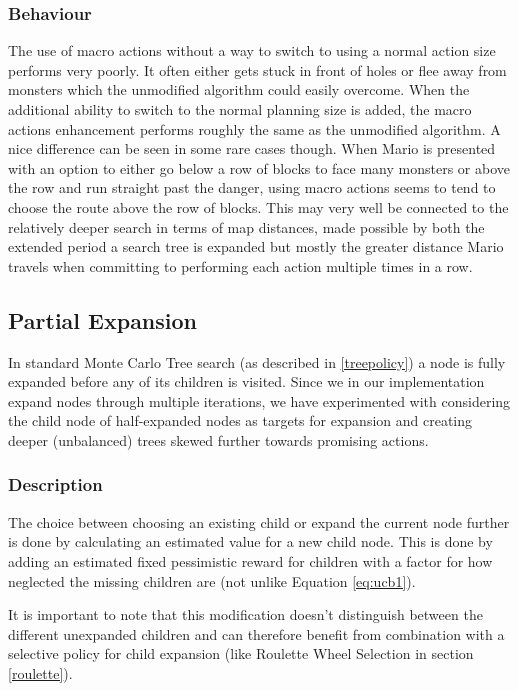 \documentclass[10pt,a4paper]{article}
\begin{document}
\subsubsection{Behaviour}
The use of macro actions without a way to switch to using a normal action size performs very poorly. It often either gets stuck in front of holes or flee away from monsters which the unmodified algorithm could easily overcome. 
When the additional ability to switch to the normal planning size is added, the macro actions enhancement performs roughly the same as the unmodified algorithm. 
A nice difference can be seen in some rare cases though. When Mario is presented with an option to either go below a row of blocks to face many monsters or above the row and run straight past the danger, using macro actions seems to tend to choose the route above the row of blocks. 
This may very well be connected to the relatively deeper search in terms of map distances, made possible by both the extended period a search tree is expanded but mostly the greater distance Mario travels when committing to performing each action multiple times in a row.


\subsection{Partial Expansion}
In standard Monte Carlo Tree search (as described in \ref{treepolicy}) %
a node is fully expanded before any of its children is visited. Since we in our implementation expand nodes through multiple iterations, we have experimented with considering the child node of half-expanded nodes as targets for expansion and creating deeper (unbalanced) trees skewed further towards promising actions. 

\subsubsection{Description}
The choice between choosing an existing child or expand the current node further is done by calculating an estimated value for a new child node. This is done by adding an estimated fixed pessimistic reward for children with a factor for how neglected the missing children are (not unlike Equation \ref{eq:ucb1}).

It is important to note that this modification doesn't distinguish between the different unexpanded children and can therefore benefit from combination with a selective policy for child expansion (like Roulette Wheel Selection in section \ref{roulette}).
\end{document}
